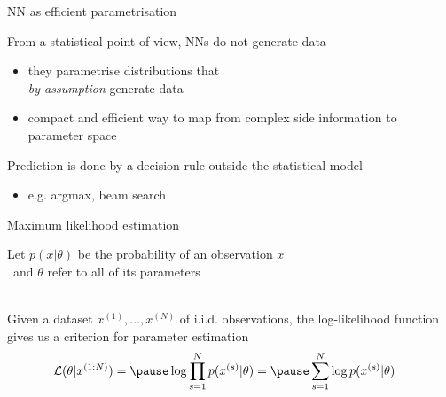 \begin{frame}{NN as efficient parametrisation}

From a statistical point of view, NNs do not generate data\\
\begin{itemize}
	\item \alert{they parametrise distributions} that \\
	\emph{by assumption} generate data
	\item compact and efficient way to \alert{map from complex side information to parameter space}
\end{itemize}

\vspace{10pt}

\pause
Prediction is done by a decision rule outside the statistical model
\begin{itemize}
	\item e.g. argmax, beam search
\end{itemize}

\end{frame}



\begin{frame}{Maximum likelihood estimation}

Let $p(x|\theta)$ be the probability of an observation $x$\\
~and $\theta$ refer to all of its parameters \\

~ \pause

Given a dataset $x^{(1)}, \ldots, x^{(N)}$ of i.i.d. observations, \pause
the log-likelihood function gives us a criterion for parameter estimation
\begin{equation*}
\begin{aligned}
\mathcal L(\theta|x^{(1:N)}) &= \pause \log \prod_{s=1}^N p(x^{(s)}|\theta) 
 = \pause \sum_{s=1}^N \log p(x^{(s)}|\theta)
\end{aligned}
\end{equation*} 


\end{frame}

